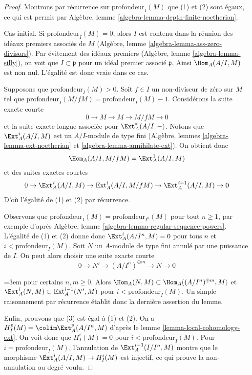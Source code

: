 \begin{proof}
Montrons par récurrence sur $\text{profondeur}_I(M)$ que (1) et (2) sont égaux,
ce qui est permis par Algèbre, lemme \ref{algebra-lemma-depth-finite-noetherian}.

\medskip\noindent
Cas initial. Si $\text{profondeur}_I(M) = 0$, alors $I$ est contenu dans la réunion
des idéaux premiers associés de $M$
(Algèbre, lemme \ref{algebra-lemma-ass-zero-divisors}).
Par évitement des idéaux premiers (Algèbre, lemme \ref{algebra-lemma-silly}),
on voit que $I \subset \mathfrak p$ pour un idéal premier associé $\mathfrak p$.
Ainsi $\Hom_A(A/I, M)$ est non nul. L'égalité est donc vraie dans ce cas.

\medskip\noindent
Supposons que $\text{profondeur}_I(M) > 0$. Soit $f \in I$ un non-diviseur de zéro
sur $M$ tel que $\text{profondeur}_I(M/fM) = \text{profondeur}_I(M) - 1$.
Considérons la suite exacte courte
$$
0 \to M \to M \to M/fM \to 0
$$
et la suite exacte longue associée pour $\Ext^*_A(A/I, -)$.
Notons que $\Ext^i_A(A/I, M)$ est un $A/I$-module de type fini
(Algèbre, lemmes \ref{algebra-lemma-ext-noetherian} et \ref{algebra-lemma-annihilate-ext}). On obtient donc
$$
\Hom_A(A/I, M/fM) = \Ext^1_A(A/I, M)
$$
et des suites exactes courtes
$$
0 \to \Ext^i_A(A/I, M) \to \text{Ext}^i_A(A/I, M/fM) \to
\Ext^{i + 1}_A(A/I, M) \to 0
$$
D'où l'égalité de (1) et (2) par récurrence.

\medskip\noindent
Observons que $\text{profondeur}_I(M) = \text{profondeur}_{I^n}(M)$ pour tout $n \geq 1$,
par exemple d'après Algèbre, lemme \ref{algebra-lemma-regular-sequence-powers}.
L'égalité de (1) et (2) donne donc $\Ext^i_A(A/I^n, M) = 0$ pour tous $n$ et $i < \text{profondeur}_I(M)$.
Soit $N$ un $A$-module de type fini annulé par une puissance de $I$.
On peut alors choisir une suite exacte courte
$$
0 \to N' \to (A/I^n)^{\oplus m} \to N \to 0
$$
{\emergencystretch=3em pour certains $n, m \geq 0$. Alors
$\Hom_A(N, M) \subset \Hom_A((A/I^n)^{\oplus m}, M)$
et
$\Ext^i_A(N, M) \subset \text{Ext}^{i - 1}_A(N', M)$
pour $i < \text{profondeur}_I(M)$. Un simple raisonnement par récurrence
établit donc la dernière assertion du lemme.\par}

\medskip\noindent
Enfin, prouvons que (3) est égal à (1) et (2).
On a $H^p_I(M) = \colim \Ext^p_A(A/I^n, M)$ d'après le lemme \ref{lemma-local-cohomology-ext}.
On voit donc que $H^i_I(M) = 0$ pour $i < \text{profondeur}_I(M)$.
Pour $i = \text{profondeur}_I(M)$, l'annulation de $\Ext_A^{i - 1}(I/I^n, M)$ montre que le morphisme
$\Ext_A^i(A/I, M) \to H_I^i(M)$ est injectif, ce qui prouve la non-annulation au degré voulu.
\end{proof}

